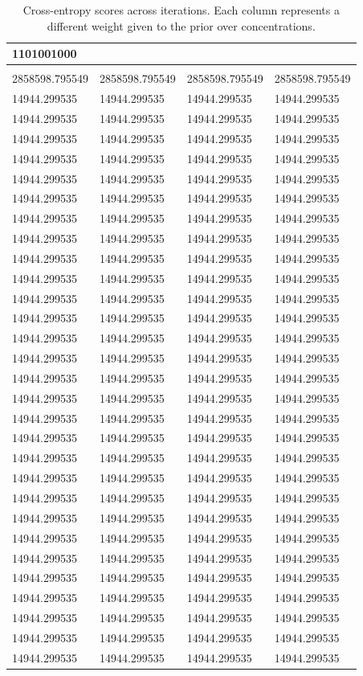 \begin{table}\begin{tabular}{|l|l|l|l|}
\hline
1101001000\\
\hline\\
2858598.795549&2858598.795549&2858598.795549&2858598.795549\\
14944.299535&14944.299535&14944.299535&14944.299535\\
14944.299535&14944.299535&14944.299535&14944.299535\\
14944.299535&14944.299535&14944.299535&14944.299535\\
14944.299535&14944.299535&14944.299535&14944.299535\\
14944.299535&14944.299535&14944.299535&14944.299535\\
14944.299535&14944.299535&14944.299535&14944.299535\\
14944.299535&14944.299535&14944.299535&14944.299535\\
14944.299535&14944.299535&14944.299535&14944.299535\\
14944.299535&14944.299535&14944.299535&14944.299535\\
14944.299535&14944.299535&14944.299535&14944.299535\\
14944.299535&14944.299535&14944.299535&14944.299535\\
14944.299535&14944.299535&14944.299535&14944.299535\\
14944.299535&14944.299535&14944.299535&14944.299535\\
14944.299535&14944.299535&14944.299535&14944.299535\\
14944.299535&14944.299535&14944.299535&14944.299535\\
14944.299535&14944.299535&14944.299535&14944.299535\\
14944.299535&14944.299535&14944.299535&14944.299535\\
14944.299535&14944.299535&14944.299535&14944.299535\\
14944.299535&14944.299535&14944.299535&14944.299535\\
14944.299535&14944.299535&14944.299535&14944.299535\\
14944.299535&14944.299535&14944.299535&14944.299535\\
14944.299535&14944.299535&14944.299535&14944.299535\\
14944.299535&14944.299535&14944.299535&14944.299535\\
14944.299535&14944.299535&14944.299535&14944.299535\\
14944.299535&14944.299535&14944.299535&14944.299535\\
14944.299535&14944.299535&14944.299535&14944.299535\\
14944.299535&14944.299535&14944.299535&14944.299535\\
14944.299535&14944.299535&14944.299535&14944.299535\\
14944.299535&14944.299535&14944.299535&14944.299535\\
\hline
\end{tabular}\caption{
Cross-entropy scores across iterations. Each column represents a different weight given to the prior over concentrations.}\end{table}

